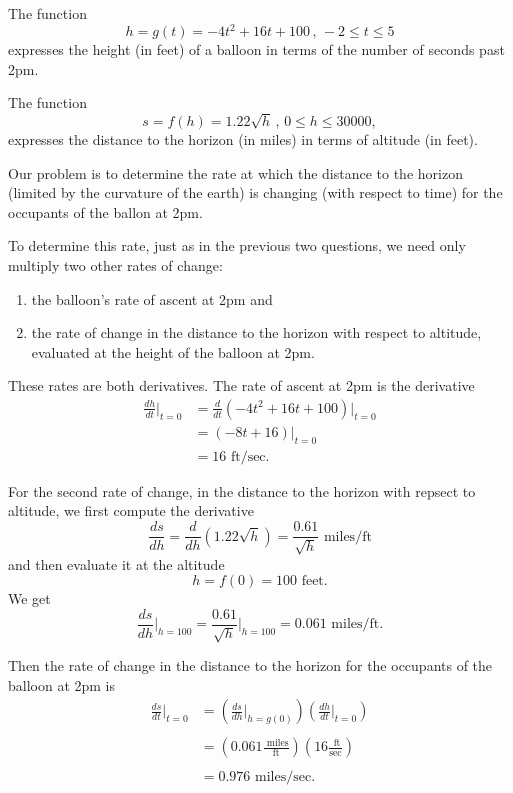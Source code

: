 \documentclass{ximera}
\begin{document}
\begin{example}  \label{Ex9dfLEReEWM}
The function
\[
     h = g(t) = -4t^2 + 16t + 100 \, , \, -2\leq t \leq 5
\]
expresses the height (in feet) of a balloon in terms of the number of seconds past 2pm. 

The function
\[
   s = f(h) = 1.22\sqrt{h} \, , \, 0\leq h \leq 30000,
\]
expresses the distance to the horizon (in miles) in terms of altitude (in feet).

Our problem is to determine the rate at which the distance to the horizon (limited by the curvature of the earth) is changing (with respect to time) for the occupants of the ballon at 2pm.

\begin{explanation}
To determine this rate, just as in the previous two questions, we need only multiply two other rates of change:

\begin{enumerate}
\item the balloon's rate of ascent at 2pm and

\item the rate of change in the distance to the horizon with respect to altitude, evaluated at the height of the balloon at 2pm. 
\end{enumerate}

These rates are both derivatives. The rate of ascent at 2pm is the derivative
\begin{align*}
\frac{dh}{dt}\Big|_{t=0} &= \frac{d}{dt}\left( -4t^2 + 16t + 100 \right) \Big|_{t=0} \\
                                     &= (-8t +16)\Big|_{t=0} \\
                                     &= 16 \text{ ft/sec}.
\end{align*}

For the second rate of change, in the distance to the horizon with repsect to altitude, we first compute the derivative
\[
  \frac{ds}{dh} = \frac{d}{dh} \left( 1.22\sqrt{h} \right) = \frac{0.61}{\sqrt{h}} \text{ miles/ft} 
\]
and then evaluate it at the altitude
\[
 h = f(0) = 100 \text{ feet} .
\]
We get
\[
    \frac{ds}{dh}\Big|_{h=100} =  \frac{0.61}{\sqrt{h}}\Big|_{h=100} = 0.061 \text{ miles/ft}.
\]

Then the rate of change in the distance to the horizon for the occupants of the balloon at 2pm is
\begin{align*}
  \frac{ds}{dt}\Big|_{t=0} &=  \left( \frac{ds}{dh}\Big|_{h=g(0)} \right)  \left( \frac{dh}{dt}\Big|_{t=0} \right) \\ \\
                                      &= \left(   0.061 \frac{\text{ miles}}{\text{ft}} \right) \left(   16 \frac{\text{ ft}}{\text{sec}}    \right) \\ \\
                                       &= 0.976 \text{ miles/sec} .
\end{align*}


\end{explanation}
\end{example}
\end{document}
